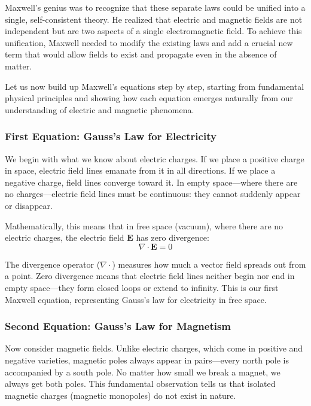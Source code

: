 Maxwell's genius was to recognize that these separate laws could be unified into a single, self-consistent theory. He realized that electric and magnetic fields are not independent but are two aspects of a single electromagnetic field. To achieve this unification, Maxwell needed to modify the existing laws and add a crucial new term that would allow fields to exist and propagate even in the absence of matter.

Let us now build up Maxwell's equations step by step, starting from fundamental physical principles and showing how each equation emerges naturally from our understanding of electric and magnetic phenomena.

\subsubsection{First Equation: Gauss's Law for Electricity}

We begin with what we know about electric charges. If we place a positive charge in space, electric field lines emanate from it in all directions. If we place a negative charge, field lines converge toward it. In empty space—where there are no charges—electric field lines must be continuous: they cannot suddenly appear or disappear.

Mathematically, this means that in free space (vacuum), where there are no electric charges, the electric field $\boldsymbol{E}$ has zero divergence:
\begin{equation}
\nabla \cdot \boldsymbol{E} = 0 \label{eq:maxwell1}
\end{equation}

The divergence operator ($\nabla \cdot$) measures how much a vector field spreads out from a point. Zero divergence means that electric field lines neither begin nor end in empty space—they form closed loops or extend to infinity. This is our first Maxwell equation, representing Gauss's law for electricity in free space.

\subsubsection{Second Equation: Gauss's Law for Magnetism}

Now consider magnetic fields. Unlike electric charges, which come in positive and negative varieties, magnetic poles always appear in pairs—every north pole is accompanied by a south pole. No matter how small we break a magnet, we always get both poles. This fundamental observation tells us that isolated magnetic charges (magnetic monopoles) do not exist in nature.

